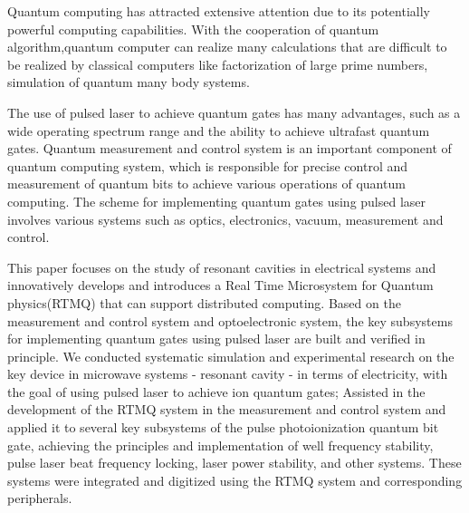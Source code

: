 \begin{abstract*}
  Quantum computing has attracted extensive attention due to its potentially powerful computing capabilities. With the cooperation of quantum algorithm,quantum computer can realize many calculations that are difficult to be realized by classical computers like factorization of large prime numbers, simulation of quantum many body systems. 


  The use of pulsed laser to achieve quantum gates has many advantages, such as a wide operating spectrum range and the ability to achieve ultrafast quantum gates. Quantum measurement and control system is an important component of quantum computing system, which is responsible for precise control and measurement of quantum bits to achieve various operations of quantum computing. The scheme for implementing quantum gates using pulsed laser involves various systems such as optics, electronics, vacuum, measurement and control. 
  
  This paper focuses on the study of resonant cavities in electrical systems and innovatively develops and introduces a Real Time Microsystem for Quantum physics(RTMQ) that can support distributed computing. Based on the measurement and control system and optoelectronic system, the key subsystems for implementing quantum gates using pulsed laser are built and verified in principle.
  We conducted systematic simulation and experimental research on the key device in microwave systems - resonant cavity - in terms of electricity, with the goal of using pulsed laser to achieve ion quantum gates; Assisted in the development of the RTMQ system in the measurement and control system and applied it to several key subsystems of the pulse photoionization quantum bit gate, achieving the principles and implementation of well frequency stability, pulse laser beat frequency locking, laser power stability, and other systems. These systems were integrated and digitized using the RTMQ system and corresponding peripherals.

\end{abstract*}
